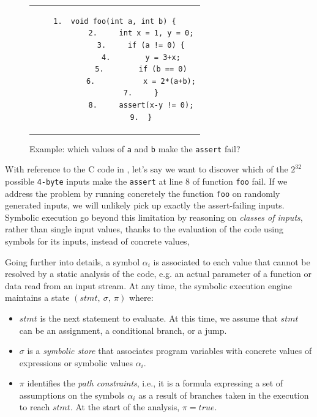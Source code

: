 \label{symbolic-execution-example}
\begin{figure}[t]
	\begin{center}
		\begin{tabular}{c}
			\hspace{-4.5cm}
			\begin{lstlisting}[basicstyle=\ttfamily\scriptsize]
			1.  void foo(int a, int b) {
			2.     int x = 1, y = 0;
			3.     if (a != 0) {
			4.        y = 3+x;
			5.        if (b == 0)
			6.           x = 2*(a+b);
			7.     }
			8.     assert(x-y != 0);
			9.  }
			\end{lstlisting}
		\end{tabular}
	\end{center}
	\vspace{-2mm}
	\caption{Example: which values of \texttt{a} and \texttt{b} make the \texttt{assert} fail?}
	\label{fig:example-1}
	\vspace{-1.5mm}
\end{figure}

With reference to the C code in , let's say we want to discover which of the $2^{32}$ possible \texttt{4-byte} inputs make the \texttt{assert} at line 8 of function \texttt{foo} fail. If we address the problem by running concretely the function \texttt{foo} on randomly generated inputs, we will unlikely pick up exactly the assert-failing inputs. Symbolic execution go beyond this limitation by reasoning on {\em classes of inputs}, rather than single input values, thanks to the evaluation of the code using symbols for its inputs, instead of concrete values,  

Going further into details, a symbol $\alpha_i$ is associated to each value that cannot be resolved by a static analysis of the code, e.g. an actual parameter of a function or data read from an input stream. At any time, the symbolic execution engine maintains a state $(stmt,~\sigma,~\pi)$ where:

\begin{itemize}
	\item $stmt$ is the next statement to evaluate. At this time, we assume that $stmt$ can be an assignment, a conditional branch, or a jump.
	
	\item $\sigma$ is a {\em symbolic store} that associates program variables with concrete values of expressions or symbolic values $\alpha_i$.
	
	\item $\pi$ identifies the {\em path constraints}, i.e., it is a formula expressing a set of assumptions on the symbols $\alpha_i$ as a result of branches taken in the execution to reach $stmt$. At the start of the analysis, $\pi=true$.
\end{itemize}

